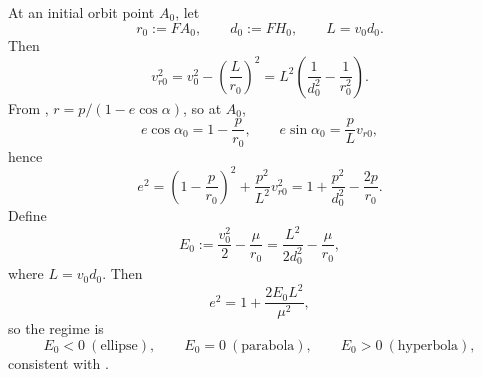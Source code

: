 At an initial orbit point \(A_0\), let
\begin{equation}
  r_0:=FA_0,\qquad d_0:=FH_0,\qquad L=v_0d_0.
\label{eq:proof2f-disc-r0d0L}
\end{equation}
Then
\begin{equation}
  v_{r0}^2=v_0^2-\left(\frac{L}{r_0}\right)^2
  =L^2\!\left(\frac{1}{d_0^2}-\frac{1}{r_0^2}\right).
\label{eq:proof2f-disc-vr0}
\end{equation}
From , \(r=p/(1-e\cos\alpha)\), so at \(A_0\),
\begin{equation}
  e\cos\alpha_0=1-\frac{p}{r_0},
  \qquad
  e\sin\alpha_0=\frac{p}{L}v_{r0},
\label{eq:proof2f-disc-e-alpha0}
\end{equation}
hence
\begin{equation}
  e^2
  =\left(1-\frac{p}{r_0}\right)^2+\frac{p^2}{L^2}v_{r0}^2
  =1+\frac{p^2}{d_0^2}-\frac{2p}{r_0}.
\label{eq:proof2f-disc-e2-initial}
\end{equation}
Define
\begin{equation}
  E_0:=\frac{v_0^2}{2}-\frac{\mu}{r_0}
  =\frac{L^2}{2d_0^2}-\frac{\mu}{r_0},
\label{eq:proof2f-disc-E0}
\end{equation}
where \(L=v_0d_0\).
Then
\begin{equation}
  e^2=1+\frac{2E_0L^2}{\mu^2},
\label{eq:proof2f-disc-e2-E0}
\end{equation}
so the regime is
\begin{equation}
  E_0<0\ (\text{ellipse}),\qquad
  E_0=0\ (\text{parabola}),\qquad
  E_0>0\ (\text{hyperbola}),
\end{equation}
consistent with .

